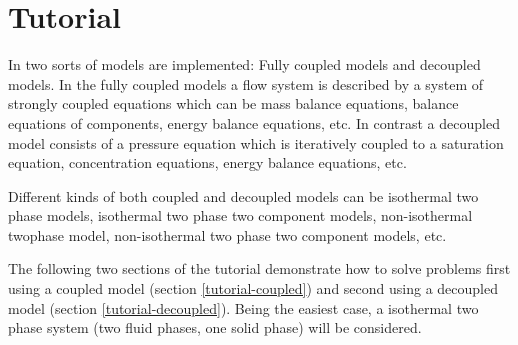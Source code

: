 \chapter[Tutorial]{Tutorial}\label{chp:tutorial}

In \Dumux two sorts of models are implemented: Fully coupled models and decoupled models. In the fully coupled models a flow system is described by a system of strongly coupled equations which can be mass balance equations, balance equations of components, energy balance equations, etc. In contrast a decoupled model consists of a pressure equation which is iteratively coupled to a saturation equation, concentration equations, energy balance equations, etc.

Different kinds of both coupled and decoupled models can be isothermal two phase models, isothermal two phase two component models, non-isothermal twophase model, non-isothermal two phase two component models, etc.

The following two sections of the tutorial demonstrate how to solve problems first using a coupled model (section \ref{tutorial-coupled}) and second using a decoupled model (section \ref{tutorial-decoupled}). Being the easiest case, a isothermal two phase system (two fluid phases, one solid phase) will be considered.


%